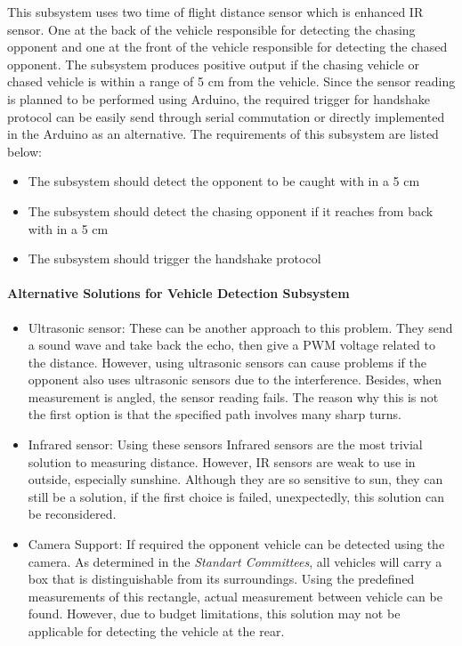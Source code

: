 \documentclass[a4paper,12pt]{article}
\begin{document}
	 This subsystem uses two time of flight distance sensor which is enhanced IR sensor. One at the back of the vehicle responsible for detecting the chasing opponent and one at the front of the vehicle responsible for detecting the chased opponent. The subsystem produces positive output if the chasing vehicle or chased vehicle is within a range of 5 cm from the vehicle. Since the sensor reading is planned to be performed using Arduino, the required trigger for handshake protocol can be  easily send through serial commutation or directly implemented in the Arduino as an alternative. The requirements of this subsystem are listed below:
	
	\begin{itemize}
		\item The subsystem should detect the opponent to be caught with in a 5 cm 
		\item The subsystem should detect the chasing opponent if it reaches from back with in a 5 cm 
		\item The subsystem should trigger the handshake protocol 
	\end{itemize}
	
	\paragraph{Alternative Solutions for Vehicle Detection Subsystem}
	\begin{itemize}
		\item {Ultrasonic sensor:} These can be another approach to this problem. They send a sound wave and take back the echo, then give a PWM voltage related to the distance. However, using ultrasonic sensors can cause problems if the opponent also uses ultrasonic sensors due to the interference. Besides, when measurement is angled, the sensor reading fails. The reason why this is not the first option is that the specified path involves many sharp turns.
		

		\item {Infrared sensor:} Using these sensors Infrared sensors are the most trivial solution to measuring distance. However, IR sensors are weak to use in outside, especially sunshine. Although they are so sensitive to sun, they can still be a solution, if the first choice is failed, unexpectedly, this solution can be reconsidered.
		
		\item {Camera Support:} If required the opponent vehicle can be detected using the camera. As determined in the \textit{Standart Committees}, all vehicles will carry a box that is distinguishable from its surroundings. Using the predefined measurements of this rectangle, actual measurement between vehicle can be found. However, due to budget limitations, this solution may not be applicable for detecting the vehicle at the rear.
		
	\end{itemize}
	
\end{document}
